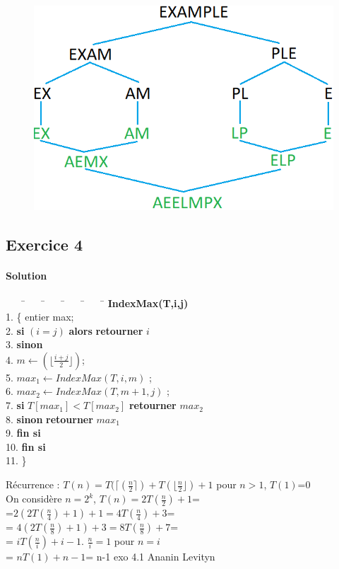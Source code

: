 \documentclass{article}[12pt]
\begin{document}
\begin{figure}[h!]
    \centering
        \includegraphics[scale = 1]{EXAMPLE.png}
\end{figure}

\newpage


\subsection*{Exercice 4}
\begin{solution} 
\paragraph{Solution} 
\begin{tabbing}
~~~~\=~~~~\=~~~~\=~~~~\=~~~~\=\kill
\> \textbf{IndexMax(T,i,j)}\\
1.\> \{ entier max;\\
2.\> \textbf{si} $(i=j)$ \textbf{alors} \textbf{retourner} $i$\\
3.\> \textbf{sinon} \\
4.\> \> $m \leftarrow ( \lfloor \frac{i+j}{2}\rfloor)$;\\
5. \> \> $max_1 \leftarrow IndexMax(T,i,m)$ ;\\
6. \> \> $max_2 \leftarrow IndexMax(T,m+1,j)$ ;\\
7. \> \> \textbf{si} $T[max_1]<T[max_2]$ \textbf{retourner} $max_2$\\
8. \> \> \textbf{sinon} \textbf{retourner} $max_1$\\
9. \> \> \textbf{fin si}\\
10. \> \textbf{fin si}\\
11.\> \}
\end{tabbing}

Récurrence : $T(n)= T(\lceil (\frac{n}{2}\rceil)+T(\lfloor\frac{n}{2}\rfloor)+1$ pour $n>1$, $T(1)$=0\\
On considère $n=2^k$, $T(n)=2T(\frac{n}{2})+1$=\\
=$2(2T(\frac{n}{4})+1)+1=4T(\frac{n}{4})+3$=\\
= $4 (2 T(\frac{n}{8})+1)+3=8 T(\frac{n}{8})+7$=\\
= $i T(\frac{n}{i})+i-1$. $\frac{n}{i}=1$ pour $n=i$\\
= $ n T(1)+n-1$= n-1
exo 4.1 Ananin Levityn 
\end{solution}
\end{document}
